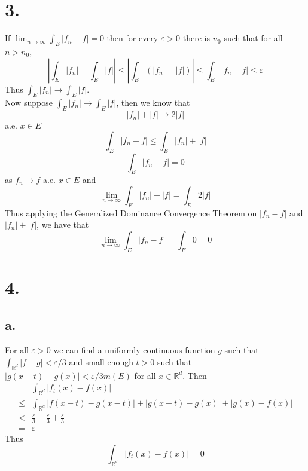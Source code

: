 \documentclass[11pt]{article}
\theoremstyle{mystyle}
\theoremstyle{definition}
\begin{document}
\section*{3.}
If $\lim_{n \to \infty} \int_E |f_n - f| = 0$ then for every $\varepsilon > 0$ there is $n_0$ such that for all $n > n_0$,  
\[
  \left|\int_E |f_n| - \int_E |f|\right| \le \left|\int_E (|f_n| - |f|) \right| \le  \int_E |f_n - f| \le \varepsilon
\]
Thus $\int_E |f_n| \to \int_E |f|$. \\
Now suppose $\int_E |f_n| \to \int_E |f|$, then we know that 
\[ 
  |f_n| + |f| \to 2|f|
\] 
a.e. $x \in E$  
\[
  \int_E |f_n - f| \le \int_E |f_n| + |f|
\] 
\[
  \int_E |f_n - f| = 0
\]
as $f_n \to f$ a.e. $x \in E$ and 
\[
  \lim_{n \to \infty} \int_E |f_n| + |f| = \int_E 2|f|
\]
Thus applying the Generalized Dominance Convergence Theorem on $|f_n - f|$ and $|f_n|+|f|$, we have that 
\[
  \lim_{n \to \infty} \int_E |f_n - f| = \int_E 0 = 0
\]
\newpage
\section*{4.}
\subsection*{a.}
For all $\varepsilon >0 $ we can find a uniformly continuous function $g$ such that $\int_{\mathbb{R}^d} |f-g| < \varepsilon/3$ and small enough $t>0$ such that $|g(x-t) - g(x)| < \varepsilon / 3m(E)$ for all $x \in \mathbb{R}^d$. Then 
\begin{align*}
  & \int_{\mathbb{R}^d} |f_t(x) - f(x)| \\
  \le& \int_{\mathbb{R}^d} |f(x-t) - g(x-t)| + |g(x-t) - g(x)| + |g(x) - f(x)| \\
  <& \displaystyle\frac{\varepsilon}{3} + \displaystyle\frac{\varepsilon}{3} + \displaystyle\frac{\varepsilon}{3} \\
  =& \varepsilon
\end{align*}
Thus 
\[
  \int_{\mathbb{R}^d} |f_t(x) - f(x)| = 0
\]
\end{document}
